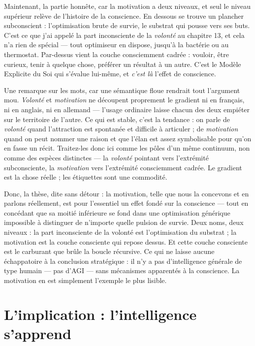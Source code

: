 \documentclass[11pt, twoside, openright]{book}
\begin{document}
Maintenant, la partie honnête, car la motivation a deux niveaux, et seul le niveau supérieur relève de l'histoire de la conscience. En dessous se trouve un plancher subconscient : l'optimisation brute de survie, le substrat qui pousse vers ses buts. C'est ce que j'ai appelé la part inconsciente de la \textit{volonté} au chapitre 13, et cela n'a rien de spécial --- tout optimiseur en dispose, jusqu'à la bactérie ou au thermostat. Par-dessus vient la couche consciemment cadrée : vouloir, être curieux, tenir à quelque chose, préférer un résultat à un autre. C'est le Modèle Explicite du Soi qui s'évalue lui-même, et \textit{c'est là} l'effet de conscience.

Une remarque sur les mots, car une sémantique floue rendrait tout l'argument mou. \textit{Volonté} et \textit{motivation} ne découpent proprement le gradient ni en français, ni en anglais, ni en allemand --- l'usage ordinaire laisse chacun des deux empiéter sur le territoire de l'autre. Ce qui est stable, c'est la tendance : on parle de \textit{volonté} quand l'attraction est spontanée et difficile à articuler ; de \textit{motivation} quand on peut nommer une raison et que l'élan est assez symbolisable pour qu'on en fasse un récit. Traitez-les donc ici comme les pôles d'un même continuum, non comme des espèces distinctes --- la \textit{volonté} pointant vers l'extrémité subconsciente, la \textit{motivation} vers l'extrémité consciemment cadrée. Le gradient est la chose réelle ; les étiquettes sont une commodité.

Donc, la thèse, dite sans détour : la motivation, telle que nous la concevons et en parlons réellement, est pour l'essentiel un effet fondé sur la conscience --- tout en concédant que sa moitié inférieure se fond dans une optimisation générique impossible à distinguer de n'importe quelle pulsion de survie. Deux noms, deux niveaux : la part inconsciente de la volonté est l'optimisation du substrat ; la motivation est la couche consciente qui repose dessus. Et cette couche consciente est le carburant que brûle la boucle récursive. Ce qui ne laisse aucune échappatoire à la conclusion stratégique : il n'y a pas d'intelligence générale de type humain --- pas d'AGI --- sans mécanismes apparentés à la conscience. La motivation en est simplement l'exemple le plus lisible.

\section*{L'implication : l'intelligence s'apprend}
\end{document}
